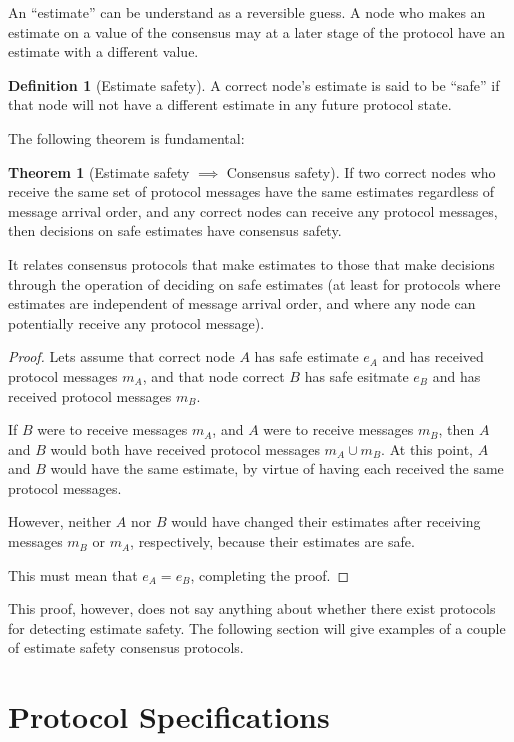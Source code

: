 \documentclass{article}
\theoremstyle{definition}
\newtheorem{thm}{Theorem}
\newtheorem{defn}{Definition}[section]
\begin{document}
An ``estimate'' can be understand as a reversible guess. A node who makes an estimate on a value of the consensus may at a later stage of the protocol have an estimate with a different value. 

\begin{defn}[Estimate safety]
A correct node's estimate is said to be ``safe'' if that node will not have a different estimate in any future protocol state.
\end{defn}

The following theorem is fundamental:

\begin{thm}[Estimate safety $\implies$ Consensus safety]
If two correct nodes who receive the same set of protocol messages have the same estimates regardless of message arrival order, and any correct nodes can receive any protocol messages, then decisions on safe estimates have consensus safety.
\end{thm}

It relates consensus protocols that make estimates to those that make decisions through the operation of deciding on safe estimates (at least for protocols where estimates are independent of message arrival order, and where any node can potentially receive any protocol message).

\begin{proof}
Lets assume that correct node $A$ has safe estimate $e_A$ and has received protocol messages $m_A$, and that node correct $B$ has safe esitmate $e_B$ and has received protocol messages $m_B$.

If $B$ were to receive messages $m_A$, and $A$ were to receive messages $m_B$, then $A$ and $B$ would both have received protocol messages $m_A \cup m_B$. At this point, $A$ and $B$ would have the same estimate, by virtue of having each received the same protocol messages.

However, neither $A$ nor $B$ would have changed their estimates after receiving messages $m_B$ or $m_A$, respectively, because their estimates are safe.

This must mean that $e_A = e_B$, completing the proof.

\end{proof}

This proof, however, does not say anything about whether there exist protocols for detecting estimate safety. The following section will give examples of a couple of estimate safety consensus protocols.

\section{Protocol Specifications}
\end{document}
